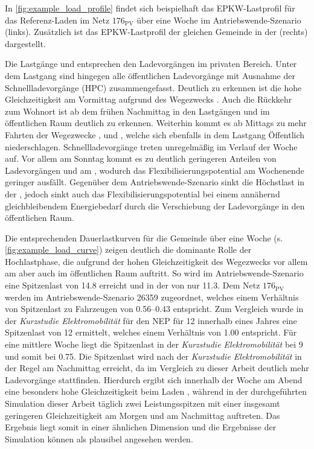 

In \autoref{fig:example_load_profile} findet sich beispielhaft das \gls{EPKW}-Lastprofil für das Referenz-Laden im Netz \(176_{\text{PV}}\) über eine Woche im Antriebswende-Szenario (links).
Zusätzlich ist das \gls{EPKW}-Lastprofil der gleichen Gemeinde in der \SzeFirmenparkplatz (rechts) dargestellt.



Die Lastgänge \zH und \Firmeparkplatz entsprechen den Ladevorgängen im privaten Bereich.
Unter dem Lastgang \oeffen sind hingegen alle öffentlichen Ladevorgänge mit Ausnahme der Schnellladevorgänge (\gls{HPC}) zusammengefasst.
Deutlich zu erkennen ist die hohe Gleichzeitigkeit am Vormittag aufgrund des Wegezwecks \Arbeitdot.
Auch die Rückkehr zum Wohnort ist ab dem frühen Nachmittag in den Lastgängen \zH und im öffentlichen Raum deutlich zu erkennen.
Weiterhin kommt es ab Mittags zu mehr Fahrten der Wegezwecke \Einkaufdot, \Erledigung und \Freizeitdot, welche sich ebenfalls in dem Lastgang \glqq Öffentlich\grqq{} niederschlagen.
Schnellladevorgänge treten unregelmäßig im Verlauf der Woche auf.
Vor allem am Sonntag kommt es zu deutlich geringeren Anteilen von Ladevorgängen \zH und am \Firmeparkplatzdot, wodurch das Flexibilisierungspotential am Wochenende geringer ausfällt.
Gegenüber dem Antriebswende-Szenario sinkt die Höchstlast in der \SzeFirmenparkplatzdot, jedoch sinkt auch das Flexibilisierungspotential bei einem annähernd gleichbleibendem Energiebedarf durch die Verschiebung der Ladevorgänge in den öffentlichen Raum.\medskip

Die entsprechenden Dauerlastkurven für die Gemeinde über eine Woche (s. \autoref{fig:example_load_curve}) zeigen deutlich die dominante Rolle der Hochlastphase, die aufgrund der hohen Gleichzeitigkeit des Wegezwecks \Arbeit vor allem am \Firmeparkplatz aber auch im öffentlichen Raum auftritt.
So wird im Antriebswende-Szenario eine Spitzenlast von \SI{14.8}{\mw} erreicht und in der \SzeFirmenparkplatz von nur \SI{11.3}{\mw}.
Dem Netz \(176_{\text{PV}}\) werden im Antriebswende-Szenario \SI{26359}{\FZ} zugeordnet, welches einem Verhältnis von Spitzenlast zu Fahrzeugen von \SIrange[range-phrase=~bzw.~]{0.56}{0.43}{\kWperFZ} entspricht.
Zum Vergleich wurde in der \textit{Kurzstudie Elektromobilität} für den \gls{NEP} \cite{Ebner2019} für \SI{12}{\MioStk} innerhalb eines Jahres eine Spitzenlast von \SI{12}{\gw} ermittelt, welches einem Verhältnis von \SI{1.00}{\kWperFZ} entspricht.
Für eine mittlere Woche liegt die Spitzenlast in der \textit{Kurzstudie Elektromobilität} bei \SI{9}{\gw} und somit bei \SI{0.75}{\kWperFZ}.
Die Spitzenlast wird nach der \textit{Kurzstudie Elektromobilität} in der Regel am Nachmittag erreicht, da im Vergleich zu dieser Arbeit deutlich mehr Ladevorgänge \zH stattfinden.
Hierdurch ergibt sich innerhalb der Woche am Abend eine besonders hohe Gleichzeitigkeit beim Laden \zHdot, während in der durchgeführten Simulation dieser Arbeit täglich zwei Leistungsspitzen mit einer insgesamt geringeren Gleichzeitigkeit am Morgen und am Nachmittag auftreten.
Das Ergebnis liegt somit in einer ähnlichen Dimension und die Ergebnisse der Simulation können als plausibel angesehen werden.

